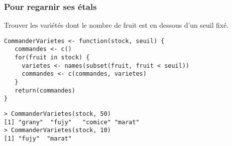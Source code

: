 \documentclass[10pt]{beamer}
\begin{document}
\begin{frame}[fragile]
  \frametitle{Pour regarnir ses étals}
  Trouver les variétés dont le nombre de fruit est en dessous d'un seuil fixé.
  \begin{lstlisting}[style=editor]
  CommanderVarietes <- function(stock, seuil) {
   commandes <- c()
   for(fruit in stock) {
     varietes <- names(subset(fruit, fruit < seuil))
     commandes <- c(commandes, varietes)
   }
   return(commandes)
}
\end{lstlisting}

\begin{lstlisting}
> CommanderVarietes(stock, 50)
[1] "grany"  "fujy"   "comice" "marat" 
> CommanderVarietes(stock, 10)
[1] "fujy"  "marat"  
\end{lstlisting}
\end{frame}


\questionSlide

 \appendix
 \backupSlides







\end{document}
